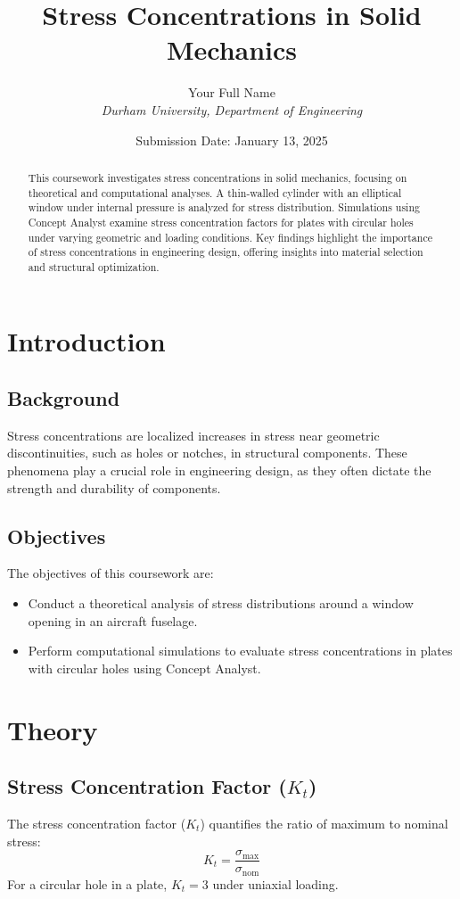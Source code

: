 \documentclass[a4paper,11pt]{article}
\title{\textbf{Stress Concentrations in Solid Mechanics}}
\author{Your Full Name \\ \textit{Durham University, Department of Engineering}}
\date{Submission Date: January 13, 2025}
\begin{document}
\maketitle
\thispagestyle{empty}

\begin{abstract}
This coursework investigates stress concentrations in solid mechanics, focusing on theoretical and computational analyses. A thin-walled cylinder with an elliptical window under internal pressure is analyzed for stress distribution. Simulations using Concept Analyst examine stress concentration factors for plates with circular holes under varying geometric and loading conditions. Key findings highlight the importance of stress concentrations in engineering design, offering insights into material selection and structural optimization.
\end{abstract}

\tableofcontents
\newpage

\section{Introduction}
\subsection{Background}
Stress concentrations are localized increases in stress near geometric discontinuities, such as holes or notches, in structural components. These phenomena play a crucial role in engineering design, as they often dictate the strength and durability of components.

\subsection{Objectives}
The objectives of this coursework are:
\begin{itemize}
    \item Conduct a theoretical analysis of stress distributions around a window opening in an aircraft fuselage.
    \item Perform computational simulations to evaluate stress concentrations in plates with circular holes using Concept Analyst.
\end{itemize}

\section{Theory}
\subsection{Stress Concentration Factor (\(K_t\))}
The stress concentration factor (\(K_t\)) quantifies the ratio of maximum to nominal stress:
\begin{equation}
    K_t = \frac{\sigma_{\text{max}}}{\sigma_{\text{nom}}}
\end{equation}
For a circular hole in a plate, \(K_t = 3\) under uniaxial loading.
\end{document}
